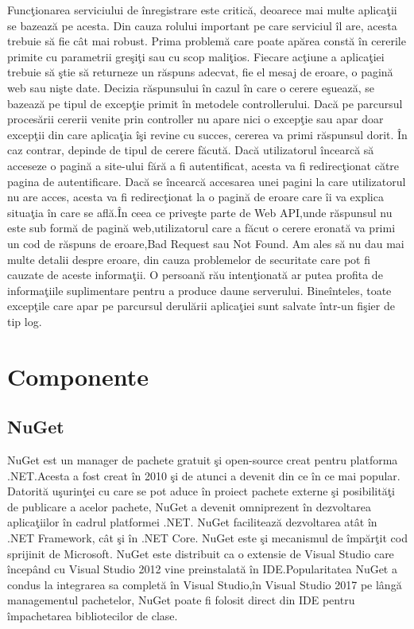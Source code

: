 \documentclass[a4paper,12pt]{report}
\begin{document}
Func\c tionarea serviciului de \^inregistrare este critic\u a, deoarece mai multe 
aplica\c tii se bazeaz\u a pe acesta. Din cauza rolului important pe care serviciul
\^il are, acesta trebuie s\u a fie c\^at mai robust. Prima problem\u a care poate  
ap\u area const\u a \^in cererile primite cu parametrii gre\c si\c ti sau cu scop
mali\c tios. Fiecare ac\c tiune a aplica\c tiei trebuie s\u a \c stie s\u a returneze
un r\u aspuns adecvat, fie el mesaj de eroare, o pagin\u a web sau ni\c ste date.
Decizia r\u aspunsului \^in cazul \^in care o cerere e\c sueaz\u a, se bazeaz\u a pe tipul
de excep\c tie primit \^in metodele controllerului.
Dac\u a pe parcursul proces\u arii cererii venite prin controller nu apare nici o 
excep\c tie sau apar doar excep\c tii din care aplica\c tia \^i\c si revine cu succes,
cererea va primi r\u aspunsul dorit. \^In caz contrar, depinde de tipul de cerere f\u acut\u a.
Dac\u a utilizatorul \^incearc\u a s\u a acceseze o pagin\u a a site-ului f\u ar\u a a fi
autentificat, acesta va fi redirec\c tionat c\u atre pagina de autentificare.
Dac\u a se \^incearc\u a accesarea unei pagini la care utilizatorul nu are acces, acesta 
va fi redirec\c tionat la o pagin\u a de eroare care \^ii va explica situa\c tia \^in care 
se afl\u a.\^In ceea ce prive\c ste parte de Web API,unde r\u aspunsul nu este sub form\u a 
de pagin\u a web,utilizatorul care a f\u acut o cerere eronat\u a va primi un cod de 
r\u aspuns de eroare,Bad Request sau Not Found.
Am ales s\u a nu dau mai multe detalii despre eroare, din cauza problemelor de securitate
care pot fi cauzate de aceste informa\c tii. O persoan\u a r\u au inten\c tionat\u a ar putea 
profita de informa\c tiile suplimentare pentru a produce daune serverului.
Bine\^inteles, toate excep\c tile care apar pe parcursul derul\u arii aplica\c tiei
sunt salvate \^intr-un fi\c sier de tip log.

\section{Componente}

\subsection{NuGet}

NuGet est un manager de pachete gratuit \c si open-source creat pentru platforma .NET.Acesta a fost creat \^in 2010
\c si de atunci a devenit din ce \^in ce mai popular. Datorit\u a u\c surin\c tei cu care se pot aduce \^in proiect 
pachete externe \c si posibilit\u a\c ti de publicare a acelor pachete, NuGet a devenit omniprezent \^in 
dezvoltarea aplica\c tiilor \^in cadrul platformei .NET. NuGet faciliteaz\u a dezvoltarea at\^at \^in .NET Framework,
c\^at \c si \^in .NET Core. NuGet este \c si mecanismul de \^imp\u ar\c tit cod sprijinit de Microsoft.
NuGet este distribuit ca o extensie de Visual Studio care \^incep\^and cu Visual Studio 2012 vine preinstalat\u a
\^in IDE.Popularitatea NuGet a condus la integrarea sa complet\u a \^in Visual Studio,\^in Visual Studio 2017 pe 
l\^ang\u a managementul pachetelor, NuGet poate fi folosit direct din IDE pentru \^impachetarea bibliotecilor
de clase.
\end{document}
